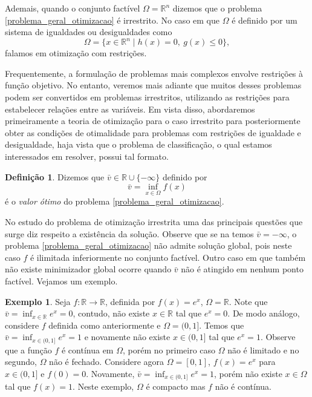 \documentclass[12pt,a4paper]{scrartcl}
\def\RR{\mathds{R}}
\theoremstyle{definition}%
\newtheorem{exem}{Exemplo}
\newtheorem{defi}{Definição}
\begin{document}


Ademais, quando o conjunto factível $\Omega = \RR^{n}$ dizemos que o problema \eqref{problema_geral_otimizacao} é irrestrito. No caso em que $\Omega$ é definido por um sistema de igualdades ou desigualdades como
\[
\Omega = \{ x\in \RR^{n} \mid h(x)=0, \ g(x) \leq 0 \},
\]
falamos em otimização com restrições.

Frequentemente, a formulação de problemas mais complexos envolve restrições à função objetivo. No entanto, veremos mais adiante que muitos desses problemas podem ser convertidos em problemas irrestritos, utilizando as restrições para estabelecer relações entre as variáveis. Em vista disso, abordaremos primeiramente a teoria de otimização para o caso irrestrito para posteriormente obter as condições de otimalidade para problemas com restrições de igualdade e desigualdade, haja vista que o problema de classificação, o qual estamos interessados em resolver, possui tal formato.

\begin{defi} \label{defi:valor_otimo}
Dizemos que $\bar{v} \in \RR \cup \{ -\infty \}$ definido por
\[
\bar{v} = \inf_{x \in \Omega} f(x)
\]
é o \emph{valor ótimo} do problema \eqref{problema_geral_otimizacao}.
\end{defi}

No estudo do problema de otimização irrestrita uma das principais questões que surge diz respeito a existência da solução. Observe que se na  temos $\bar{v} = - \infty$, o problema \eqref{problema_geral_otimizacao} não admite solução global, pois neste caso $f$ é ilimitada inferiormente no conjunto factível. Outro caso em que também não existe minimizador global ocorre quando $\bar{v}$ não é atingido em nenhum ponto factível. Vejamos um exemplo.

\begin{exem}
Seja $f: \RR \rightarrow \RR$, definida por $f(x) = e^{x}$, $\Omega = \RR$. Note que $\bar{v} = \inf_{x \in \RR} e^{x} = 0$, contudo, não existe $x \in \RR$ tal que $e^{x} = 0$. 
De modo análogo, considere $f$ definida como anteriormente e $\Omega = (0,1]$. Temos que $\bar{v} = \inf_{x \in (0,1]} e^{x} = 1$ e novamente não existe $x \in (0,1]$ tal que $e^{x}=1$. Observe que a função $f$ é contínua em $\Omega$, porém no primeiro caso $\Omega$ não é limitado e no segundo, $\Omega$ não é fechado. 
Considere agora $\Omega = [0,1]$, $f(x)=e^{x}$ para $x \in (0,1]$ e $f(0)=0$. Novamente, $\bar{v} = \inf_{x \in (0,1]} e^{x} = 1$, porém não existe $x\in \Omega$ tal que $f(x)=1$. Neste exemplo, $\Omega$ é compacto mas $f$ não é contínua.
\end{exem}
\end{document}
